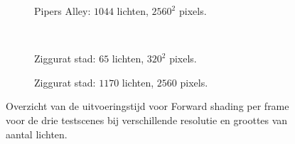 \begin{figure}[t]
\begin{adjustbox}{minipage=\textwidth, scale=0.6}
\begin{subfigure}[b]{0.8\textwidth}
      \label{fig:ts-frames-forward:alley-low}
    \end{subfigure}
  \end{adjustbox}\hspace{-0.075\textwidth} %
  \begin{adjustbox}{minipage=\textwidth, scale=0.6}
    \begin{subfigure}[b]{0.8\textwidth}
      \centering
      \def\svgwidth{\textwidth}
      
      \caption{Pipers Alley: $1044$ lichten, $2560^2$ pixels.}
      \label{fig:ts-frames-forward:alley-high}
    \end{subfigure}
  \end{adjustbox} \\
  \begin{adjustbox}{minipage=\textwidth, scale=0.6}
    \begin{subfigure}[b]{0.8\textwidth}
      \centering
      \def\svgwidth{\textwidth}
      
      \caption{Ziggurat stad: $65$ lichten, $320^2$ pixels.}
      \label{fig:ts-frames-forward:city-low}
    \end{subfigure}
  \end{adjustbox}\hspace{-0.075\textwidth} %
  \begin{adjustbox}{minipage=\textwidth, scale=0.6}
    \begin{subfigure}[b]{0.8\textwidth}
      \centering
      \def\svgwidth{\textwidth}
      
      \caption{Ziggurat stad: $1170$ lichten, $2560$ pixels.}
      \label{fig:ts-frames-forward:city-high}
    \end{subfigure}
  \end{adjustbox}
  \caption{Overzicht van de uitvoeringstijd voor Forward shading per frame voor de
           drie testscenes bij verschillende resolutie en groottes van aantal
           lichten.}
  \label{fig:ts-frames-forward}
\end{figure}

